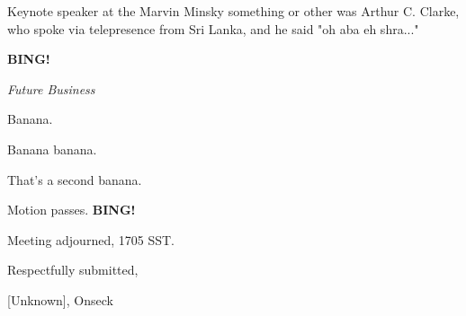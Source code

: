 \documentclass[12pt]{article}
\newcommand{\bing}{{\bf BING!} }
\newcommand{\goto}[1]{\bing \vskip 12pt \centerline{{\em{#1}}}}
\begin{document}
Keynote speaker at the Marvin Minsky something or other was Arthur C. Clarke, who spoke via telepresence from Sri Lanka, and he said "oh aba eh shra..."

\goto{Future Business}

Banana.

Banana banana.

That's a second banana.

Motion passes. \bing

\vspace{12pt}

\noindent
Meeting adjourned, 1705 SST.

\vspace{18pt}

\centerline{Respectfully submitted,}
\centerline{[Unknown], Onseck}
\end{document}
